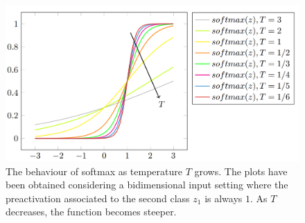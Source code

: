 \begin{figure}[t]
    \centering
    \includegraphics[width=\textwidth]{Figures/Softmaxbehaviour.png}
    \caption{The behaviour of softmax as temperature $T$ grows. The plots have been obtained considering a bidimensional input setting where the preactivation associated to the second class $z_1$ is always $1$. As $T$ decreases, the function becomes steeper.}\label{fig:softmax}
\end{figure}

